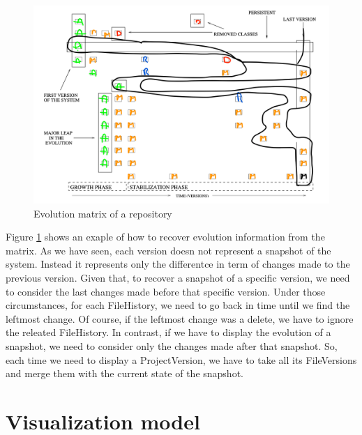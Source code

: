 \begin{figure}
    \center
    \includegraphics[width=\textwidth]{ApproachMatrix2.png}
    \caption{Evolution matrix of a repository}
    \label{fig:evolutionMatrixApproach2}
\end{figure}

Figure  \ref{fig:evolutionMatrixApproach2} shows an exaple of how to recover evolution information from the matrix. 
As we have seen, each version doesn not represent a snapshot of the system.
Instead it represents only the differentce in term of changes made to the previous version. 
Given that, to recover a snapshot of a specific version, we need to consider the last changes made before that specific version.
Under those circumstances, for each FileHistory, we need to go back in time until we find the leftmost change. Of course, if the leftmost change was a delete, we have to ignore the releated FileHistory.
In contrast, if we have to display the evolution of a snapshot, we need to consider only the changes made after that snapshot. 
So, each time we need to display a ProjectVersion, we have to take all its FileVersions and merge them with the current state of the snapshot. 

\section{Visualization model}

